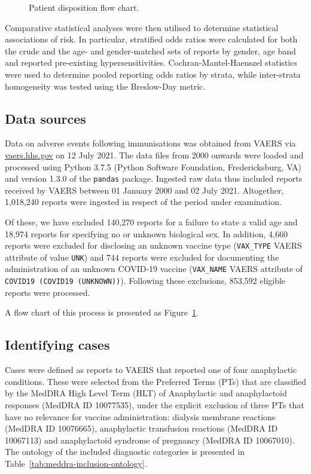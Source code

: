 \documentclass{article}
\begin{document}
\begin{figure}
    \centering
    
    \caption{Patient disposition flow chart.}
    \label{fig:patient_disposition}
\end{figure}

Comparative statistical analyses were then utilised to determine statistical associations of risk.
In particular, stratified odds ratios were calculated for both the crude and the age- and gender-matched sets of reports by gender, age band and reported pre-existing hypersensitivities.
Cochran-Mantel-Haenszel statistics were used to determine pooled reporting odds ratios by strata, while inter-strata homogeneity was tested using the Breslow-Day metric.

\subsection{Data sources}

Data on adverse events following immunisations was obtained from VAERS via \url{vaers.hhs.gov} on 12 July 2021.
The data files from 2000 onwards were loaded and processed using Python 3.7.5 (Python Software Foundation, Fredericksburg, VA) and version 1.3.0 of the \texttt{pandas} package.\cite{mckinney2011pandas}
Ingested raw data thus included reports received by VAERS between 01 January 2000 and 02 July 2021.
Altogether, 1,018,240 reports were ingested in respect of the period under examination.

Of these, we have excluded 140,270 reports for a failure to state a valid age and 18,974 reports for specifying no or unknown biological sex.
In addition, 4,660 reports were excluded for disclosing an unknown vaccine type (\texttt{VAX\_TYPE} VAERS attribute of value \texttt{UNK}) and 744 reports were excluded for documenting the administration of an unknown COVID-19 vaccine (\texttt{VAX\_NAME} VAERS attribute of \texttt{COVID19 (COVID19 (UNKNOWN))}).
Following these exclusions, 853,592 eligible reports were processed.

A flow chart of this process is presented as Figure~\ref{fig:patient_disposition}.

\subsection{Identifying cases}\label{subsec:identifying-cases}

Cases were defined as reports to VAERS that reported one of four anaphylactic conditions.
These were selected from the Preferred Terms (PTs) that are classified by the MedDRA High Level Term (HLT) of Anaphylactic and anaphylactoid responses (MedDRA ID 10077535), under the explicit exclusion of three PTs that have no relevance for vaccine administration: dialysis membrane reactions (MedDRA ID 10076665), anaphylactic transfusion reactions (MedDRA ID 10067113) and anaphylactoid syndrome of pregnancy (MedDRA ID 10067010).
The ontology of the included diagnostic categories is presented in Table~\ref{tab:meddra-inclusion-ontology}.
\end{document}
